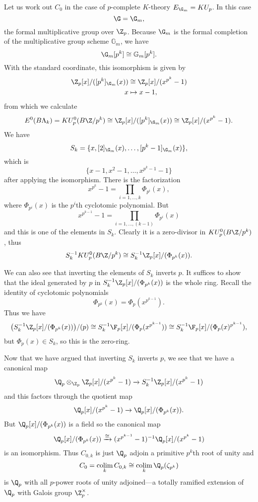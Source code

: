 \begin{example} \label{padicktheory}
Let us work out \(C_0\) in the case of $p$-complete $K$-theory \(E_{\G_m} = KU_p\). In this case 
\[
\G = \G_m,
\]
the formal multiplicative group over \(\Z_p\).  Because \(\G_m\) is the formal completion of the multiplicative group scheme \(\mathbb G_m\), we have
\[
\G_m[p^k] \cong \mathbb{G}_m[p^k].
\]
With the standard coordinate, this isomorphism is given by
\begin{align*}
\Z_p[x]/([p^k]_{\G_m}(x)) & \cong \Z_p[x]/(x^{p^k}-1) \\
x & \mapsto x-1,
\end{align*}
from which we calculate 
\[
E^0(B\Lk) = KU_{p}^0(B\Z/p^k) \cong \Z_p[x]/([p^k]_{\G_m}(x)) \cong \Z_p[x]/(x^{p^k}-1).
\]
We have
\[
S_k = \{x,[2]_{\G_m}(x),\ldots, [p^k-1]_{\G_m}(x)\},
\]
which is
\[
\{x-1,x^2-1, \ldots, x^{p^k-1}-1\}
\]
after applying the isomorphism.
There is the factorization
\[
x^{p^k}-1 = \prod_{i=1,\ldots,k}\Phi_{p^i}(x),
\]
where \(\Phi_{p^i}(x)\) is the \(p^i\)th cyclotomic polynomial. But
\[
x^{p^{k-1}}-1 = \prod_{i=1,\ldots,(k-1)}\Phi_{p^i}(x)
\]
and this is one of the elements in \(S_k\). Clearly it is a zero-divisor in \(KU_{p}^0(B\Z/p^k)\), thus
\[
S_{k}^{-1}KU_{p}^0(B\Z/p^k) \cong S_{k}^{-1}\Z_p[x]/(\Phi_{p^k}(x)).
\]

We can also see that inverting the elements of \(S_{k}\) inverts \(p\). It suffices to show that the ideal generated by \(p\) in \(S_{k}^{-1}\Z_p[x]/(\Phi_{p^k}(x))\) is the whole ring. Recall the identity of cyclotomic polynomials 
\[
\Phi_{p^k}(x) = \Phi_p(x^{p^{k-1}}).
\]
Thus we have
\[
\big ( S_{k}^{-1}\Z_p[x]/(\Phi_{p^k}(x)) \big )/(p) \cong S_{k}^{-1}\F_p[x]/(\Phi_{p}(x^{p^{k-1}})) \cong S_{k}^{-1}\F_p[x]/(\Phi_{p}(x)^{p^{k-1}}),
\]
but \(\Phi_{p}(x) \in S_k\), so this is the zero-ring.

Now that we have argued that inverting \(S_k\) inverts \(p\), we see that we have a canonical map
\[
\Q_p \otimes_{\Z_p} \Z_p[x]/(x^{p^k}-1) \xrightarrow{} S_{k}^{-1}\Z_p[x]/(x^{p^k}-1) 
\]
and this factors through the quotient map
\[
\Q_p[x]/(x^{p^k}-1) \xrightarrow{} \Q_p[x]/(\Phi_{p^k}(x)).
\]
But \(\Q_p[x]/(\Phi_{p^k}(x))\) is a field so the canonical map
\[
\Q_p[x]/(\Phi_{p^k}(x)) \xrightarrow{\cong} (x^{p^{k-1}}-1)^{-1}\Q_p[x]/(x^{p^k}-1)
\]
is an isomorphism. Thus \(C_{0,k}\) is just \(\Q_p\) adjoin a primitive \(p^k\)th root of unity and
\[
C_0 = \colim_k C_{0,k} \cong \colim_k \Q_p(\zeta_{p^k})
\]
is \(\Q_p\) with all \(p\)-power roots of unity adjoined---a totally ramified extension of \(\Q_p\) with Galois group \(\Z_{p}^{\times}\).
\end{example}

